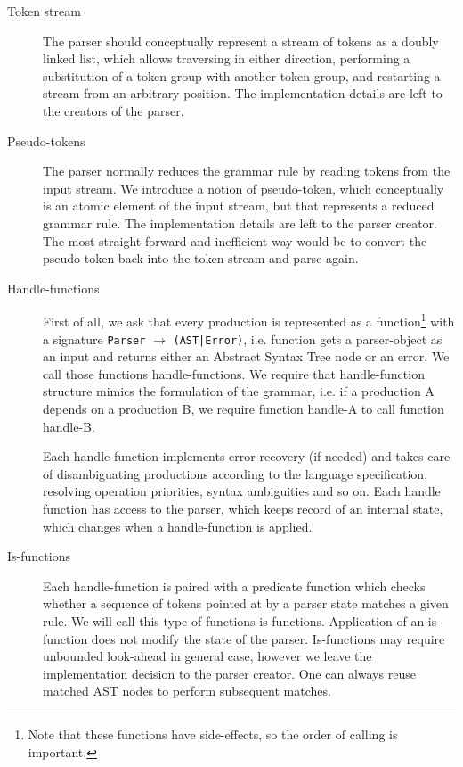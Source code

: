 \begin{description}
    \item[Token stream] The parser should conceptually represent
    a stream of tokens as a doubly linked list, which allows
    traversing in either direction, performing a substitution of
    a token group with another token group, and restarting a 
    stream from an arbitrary position.  The implementation details
    are left to the creators of the parser.

    \item[Pseudo-tokens] The parser normally reduces the grammar rule
    by reading tokens from the input stream.  We introduce a notion
    of pseudo-token, which conceptually is an atomic element of the 
    input stream, but that represents a reduced grammar rule.  The 
    implementation details are left to the parser creator.  The most
    straight forward and inefficient way would be to convert the 
    pseudo-token back into the token stream and parse again.
    
    \item[Handle-functions] First of all, we ask that every production
    is represented as a function\footnote{Note that these functions
    have side-effects, so the order of calling is important.} with a
    signature \verb/Parser/ $\to$ \verb/(AST|Error)/, i.e. function gets a
    parser-object as an input and returns either an Abstract Syntax Tree
    node or an error.  We call those functions handle-functions. We
    require that handle-function structure mimics the formulation of the
    grammar, i.e. if a production A depends on a production B, we
    require function handle-A to call function handle-B.

    Each handle-function implements error recovery (if needed) and takes
    care of disambiguating productions according to the language
    specification, resolving operation priorities, syntax ambiguities
    and so on.  Each handle function has access to the parser, which
    keeps record of an internal state, which changes when a 
    handle-function is applied.  
    
    \item[Is-functions] Each handle-function is paired with a predicate
    function which checks whether a sequence of tokens pointed at by a
    parser state matches a given rule.  We will call this type of
    functions is-functions.  Application of an is-function does not modify
    the state of the parser.  Is-functions may require unbounded
    look-ahead in general case, however we leave the implementation
    decision to the parser creator.  One can always reuse matched AST
    nodes to perform subsequent matches.


\end{description}
